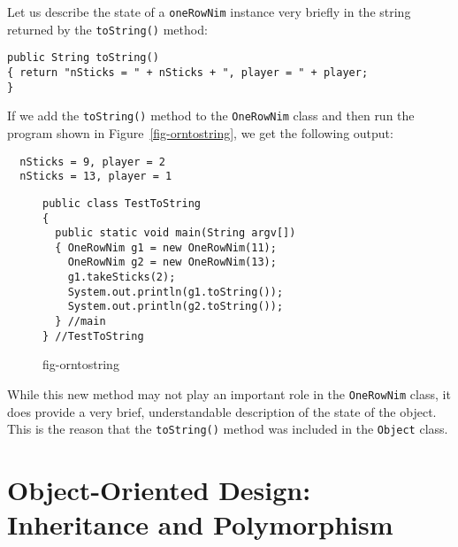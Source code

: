 \noindent Let us describe the state of a {\tt oneRowNim} instance very briefly
in the string returned by the {\tt toString()} method:

\begin{jjjlisting}
\begin{lstlisting}
public String toString()
{ return "nSticks = " + nSticks + ", player = " + player;
}
\end{lstlisting}
\end{jjjlisting}

\noindent If we add the {\tt toString()} method to the {\tt OneRowNim} class
and then run the program shown in Figure~\ref{fig-orntostring},
we get the following output:

\begin{jjjlisting}
\begin{lstlisting}
  nSticks = 9, player = 2
  nSticks = 13, player = 1
\end{lstlisting}
\end{jjjlisting}


\begin{figure}[h]
\jjjprogstart
\begin{jjjlisting}
\begin{lstlisting}
public class TestToString
{
  public static void main(String argv[])
  { OneRowNim g1 = new OneRowNim(11);
    OneRowNim g2 = new OneRowNim(13);
    g1.takeSticks(2);
    System.out.println(g1.toString());
    System.out.println(g2.toString());
  } //main
} //TestToString
\end{lstlisting}
\end{jjjlisting}
{fig-orntostring}
\end{figure}

\noindent While this new method may not play an important role in the
{\tt OneRowNim} class, it does provide a very brief, understandable
description of the state of the object.  This is the reason that the
{\tt toString()} method was included in the {\tt Object} class.

\section{Object-Oriented Design: Inheritance and Polymorphism}
\label{object-oriented-design-inheritanceand-polymorphism}

